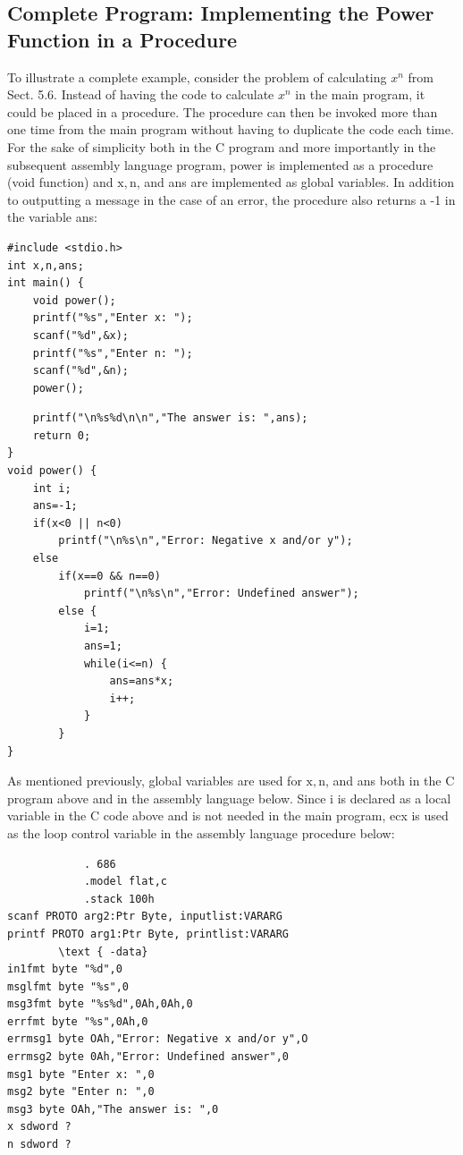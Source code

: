 \documentclass[10pt]{article}
\begin{document}
\subsection*{Complete Program: Implementing the Power Function in a Procedure}
To illustrate a complete example, consider the problem of calculating $x^{n}$ from Sect. 5.6. Instead of having the code to calculate $x^{n}$ in the main program, it could be placed in a procedure. The procedure can then be invoked more than one time from the main program without having to duplicate the code each time. For the sake of simplicity both in the C program and more importantly in the subsequent assembly language program, power is implemented as a procedure (void function) and $\mathrm{x}, \mathrm{n}$, and ans are implemented as global variables. In addition to outputting a message in the case of an error, the procedure also returns a -1 in the variable ans:

\begin{verbatim}
#include <stdio.h>
int x,n,ans;
int main() {
    void power();
    printf("%s","Enter x: ");
    scanf("%d",&x);
    printf("%s","Enter n: ");
    scanf("%d",&n);
    power();
\end{verbatim}

\begin{verbatim}
    printf("\n%s%d\n\n","The answer is: ",ans);
    return 0;
}
void power() {
    int i;
    ans=-1;
    if(x<0 || n<0)
        printf("\n%s\n","Error: Negative x and/or y");
    else
        if(x==0 && n==0)
            printf("\n%s\n","Error: Undefined answer");
        else {
            i=1;
            ans=1;
            while(i<=n) {
                ans=ans*x;
                i++;
            }
        }
}
\end{verbatim}

As mentioned previously, global variables are used for $\mathrm{x}, \mathrm{n}$, and ans both in the C program above and in the assembly language below. Since i is declared as a local variable in the C code above and is not needed in the main program, ecx is used as the loop control variable in the assembly language procedure below:

\begin{verbatim}
            . 686
            .model flat,c
            .stack 100h
scanf PROTO arg2:Ptr Byte, inputlist:VARARG
printf PROTO arg1:Ptr Byte, printlist:VARARG
        \text { -data}
in1fmt byte "%d",0
msglfmt byte "%s",0
msg3fmt byte "%s%d",0Ah,0Ah,0
errfmt byte "%s",0Ah,0
errmsg1 byte OAh,"Error: Negative x and/or y",O
errmsg2 byte 0Ah,"Error: Undefined answer",0
msg1 byte "Enter x: ",0
msg2 byte "Enter n: ",0
msg3 byte OAh,"The answer is: ",0
x sdword ?
n sdword ?
\end{verbatim}
\end{document}
